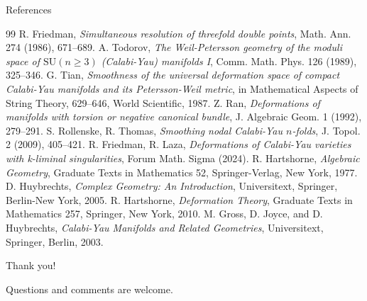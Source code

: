\documentclass{beamer}
\theoremstyle{definition}
\theoremstyle{plain}
\begin{document}
\begin{frame}[allowframebreaks]{References}
    \begin{thebibliography}{99}
         R. Friedman, \textit{Simultaneous resolution of threefold double points}, Math. Ann. 274 (1986), 671--689.
         A. Todorov, \textit{The Weil-Petersson geometry of the moduli space of $\mathrm{SU}(n\ge 3)$ (Calabi-Yau) manifolds I}, Comm. Math. Phys. 126 (1989), 325--346.
         G. Tian, \textit{Smoothness of the universal deformation space of compact Calabi-Yau manifolds and its Petersson-Weil metric}, in Mathematical Aspects of String Theory, 629--646, World Scientific, 1987.
         Z. Ran, \textit{Deformations of manifolds with torsion or negative canonical bundle}, J. Algebraic Geom. 1 (1992), 279--291.
         S. Rollenske, R. Thomas, \textit{Smoothing nodal Calabi-Yau $n$-folds}, J. Topol. 2 (2009), 405--421.
         R. Friedman, R. Laza, \textit{Deformations of Calabi-Yau varieties with k-liminal singularities}, Forum Math. Sigma (2024).
         R. Hartshorne, \textit{Algebraic Geometry}, Graduate Texts in Mathematics 52, Springer-Verlag, New York, 1977.
         D. Huybrechts, \textit{Complex Geometry: An Introduction}, Universitext, Springer, Berlin-New York, 2005.
         R. Hartshorne, \textit{Deformation Theory}, Graduate Texts in Mathematics 257, Springer, New York, 2010.
         M. Gross, D. Joyce, and D. Huybrechts, \textit{Calabi-Yau Manifolds and Related Geometries}, Universitext, Springer, Berlin, 2003.
    \end{thebibliography}
\end{frame}

\begin{frame}
    \centering
    \Huge{Thank you!}
    
    \vspace{1cm}
    \large{Questions and comments are welcome.}
\end{frame}
\end{document}
